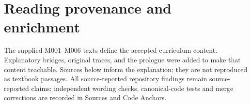 \section{Reading provenance and enrichment}\label{01-foundations-i-ch002-reading-provenance-and-enrichment}

\hypertarget{01-foundations-i-ch002-reading-provenance-and-enrichment}{}

The supplied M001--M006 texts define the accepted curriculum content. Explanatory bridges, original traces, and the prologue were added to make that content teachable. Sources below inform the explanation; they are not reproduced as textbook passages. All source-reported repository findings remain source-reported claims; independent wording checks, canonical-code tests and merge corrections are recorded in Sources and Code Anchors.

